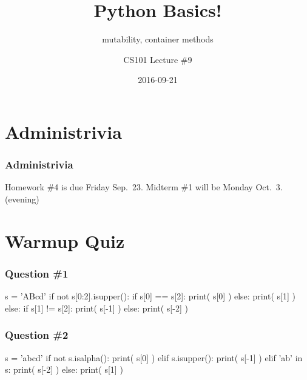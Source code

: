 \documentclass[11pt]{beamer}
\title{Python Basics!}
\subtitle{mutability, container methods}
\author{CS101 Lecture \#9}
\date{2016-09-21}
\begin{document}
  \setcounter{showProgressBar}{0}
  \setcounter{showSlideNumbers}{0}

\frame{\titlepage}

\setcounter{framenumber}{0}
\setcounter{showProgressBar}{1}
\setcounter{showSlideNumbers}{1}

\section{Administrivia}

\begin{frame}
  \frametitle{Administrivia}
  \Enlarge
  \begin{itemize}
  \myitem  Homework \#4 is due Friday Sep.\ 23.
  \myitem  Midterm \#1 will be Monday Oct.\ 3.  (evening)
  \end{itemize}
\end{frame}

\section{Warmup Quiz}

\begin{frame}[fragile]
  \frametitle{Question \#1}
  \Enlarge

  \begin{semiverbatim}
s = 'ABcd'
if not s[0:2].isupper():
    if s[0] == s[2]:
        print( s[0] )
    else:
        print( s[1] )
else:
    if s[1] != s[2]:
        print( s[-1] )
    else:
        print( s[-2] )
  \end{semiverbatim}
\end{frame}

\begin{frame}[fragile]
  \frametitle{Question \#2}
  \Enlarge

  \begin{semiverbatim}
s = 'abcd'
if not s.isalpha():
    print( s[0] )
elif s.isupper():
    print( s[-1] )
elif 'ab' in s:
    print( s[-2] )
else:
    print( s[1] )
  \end{semiverbatim}
\end{frame}
\end{document}
